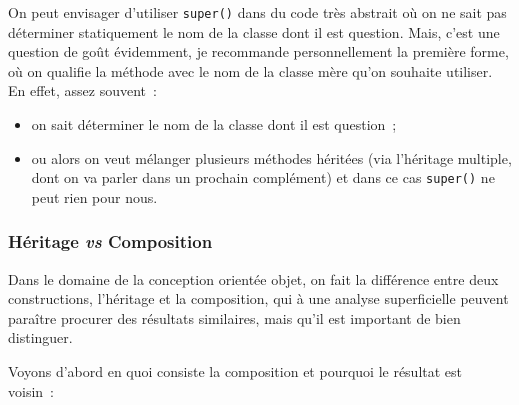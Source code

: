     On peut envisager d'utiliser \texttt{super()} dans du code très abstrait
où on ne sait pas déterminer statiquement le nom de la classe dont il
est question. Mais, c'est une question de goût évidemment, je recommande
personnellement la première forme, où on qualifie la méthode avec le nom
de la classe mère qu'on souhaite utiliser. En effet, assez souvent~:

\begin{itemize}
\tightlist
\item
  on sait déterminer le nom de la classe dont il est question~;
\item
  ou alors on veut mélanger plusieurs méthodes héritées (via l'héritage
  multiple, dont on va parler dans un prochain complément) et dans ce
  cas \texttt{super()} ne peut rien pour nous.
\end{itemize}

    \hypertarget{huxe9ritage-vs-composition}{%
\subsubsection{\texorpdfstring{Héritage \emph{vs}
Composition}{Héritage vs Composition}}\label{huxe9ritage-vs-composition}}

    Dans le domaine de la conception orientée objet, on fait la différence
entre deux constructions, l'héritage et la composition, qui à une
analyse superficielle peuvent paraître procurer des résultats
similaires, mais qu'il est important de bien distinguer.

Voyons d'abord en quoi consiste la composition et pourquoi le résultat
est voisin~:

